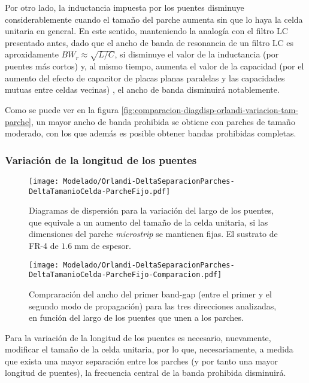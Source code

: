 Por otro lado, la inductancia impuesta por los puentes disminuye considerablemente cuando el tamaño del parche aumenta sin que lo haya la celda unitaria en general. En este sentido, manteniendo la analogía con el filtro LC presentado antes, dado que el ancho de banda de resonancia de un filtro LC es aproxidamente $BW_r \approx \sqrt{L/C}$, si disminuye el valor de la inductancia (por puentes más cortos) y, al mismo tiempo, aumenta el valor de la capacidad (por el aumento del efecto de capacitor de placas planas paralelas y las capacidades mutuas entre celdas vecinas) , el ancho de banda disminuirá notablemente.

Como se puede ver en la figura \ref{fig:comparacion-diagdisp-orlandi-variacion-tam-parche}, un mayor ancho de banda prohibida se obtiene con parches de tamaño moderado, con los que además es posible obtener bandas prohibidas completas.


\subsubsection{Variación de la longitud de los puentes}


\begin{figure}[h]
	\centering
  	\texttt{[image: Modelado/Orlandi-DeltaSeparacionParches-DeltaTamanioCelda-ParcheFijo.pdf]}
	\caption{Diagramas de dispersión para la variación del largo de los puentes, que equivale a un aumento del tamaño de la celda unitaria, si las dimensiones del parche \textit{microstrip} se mantienen fijas. El sustrato de FR-4 de $1.6\;\text{mm}$ de espesor.}
	\label{fig:diagdisp-orlandi-variacion-long-puentes}
\end{figure}



\begin{figure}[h]
	\centering
	\texttt{[image: Modelado/Orlandi-DeltaSeparacionParches-DeltaTamanioCelda-ParcheFijo-Comparacion.pdf]}
	\caption{Compraración del ancho del primer band-gap (entre el primer y el segundo modo de propagación) para las tres direcciones analizadas, en función del largo de los puentes que unen a los parches.}
	\label{fig:comparacion-diagdisp-orlandi-long-puentes}
\end{figure}


Para la variación de la longitud de los puentes es necesario, nuevamente, modificar el tamaño de la celda unitaria, por lo que, necesariamente, a medida que exista una mayor separación entre los parches (y por tanto una mayor longitud de puentes), la frecuencia central de la banda prohibida disminuirá.

